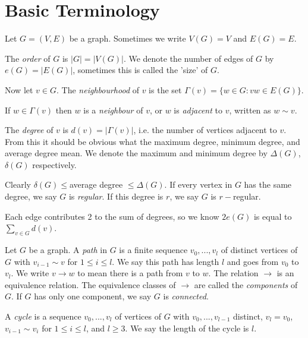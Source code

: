 \documentclass[a4paper]{article}
\begin{document}
\newpage

\section{Basic Terminology}
Let $G=(V,E)$ be a graph. Sometimes we write $V(G) = V$ and $E(G) = E$.

The \emph{order} of $G$ is $|G| = |V(G)|$. We denote the number of edges of $G$ by $e(G)=|E(G)|$, sometimes this is called the 'size' of $G$.

Now let $v \in G$. The \emph{neighbourhood} of $v$ is the set $\Gamma(v) = \{w \in G: vw \in E(G)\}$.

If $w \in \Gamma(v)$ then $w$ is a \emph{neighbour} of $v$, or $w$ is \emph{adjacent} to $v$, written as $w \sim v$.

The \emph{degree} of $v$ is $d(v) = |\Gamma(v)|$, i.e. the number of vertices adjacent to $v$. From this it should be obvious what the maximum degree, minimum degree, and average degree mean. We denote the maximum and minimum degree by $\Delta(G)$, $\delta(G)$ respectively.

Clearly $\delta(G) \leq $average degree $\leq \Delta(G)$. If every vertex in $G$ has the same degree, we say $G$ is \emph{regular}. If this degree is $r$, we say $G$ is $r-$regular.

\begin{eg}
Each edge contributes 2 to the sum of degrees, so we know $2e(G)$ is equal to $\sum_{v \in G} d(v)$.
\end{eg}

Let $G$ be a graph. A \emph{path} in $G$ is a finite sequence $v_0,...,v_l$ of distinct vertices of $G$ with $v_{i-1} \sim v$ for $1 \leq i \leq l$. We say this path has length $l$ and goes from $v_0$ to $v_l$. We write $v \to w$ to mean there is a path from $v$ to $w$. The relation $\to$ is an equivalence relation. The equivalence classes of $\to$ are called the \emph{components} of $G$. If $G$ has only one component, we say $G$ is \emph{connected}.

A \emph{cycle} is a sequence $v_0,...,v_l$ of vertices of $G$ with $v_0,...,v_{l-1}$ distinct, $v_l = v_0$, $v_{i-1} \sim v_i$ for $1 \leq i \leq l$, and $l \geq 3$. We say the length of the cycle is $l$. 

\end{document}
